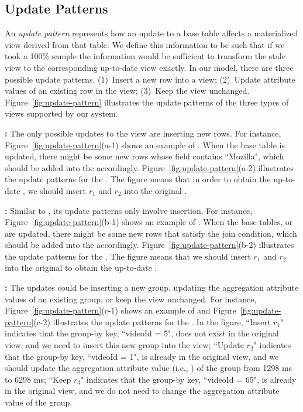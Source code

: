 \subsection{Update Patterns}\label{subsec:pattern}
An \emph{update pattern} represents how an update to a base table affects a materialized view derived from that table.
We define this information to be such that if we took a 100\% sample the information would be sufficient to transform the stale view to the corresponding up-to-date view exactly. 
In our model, there are three possible update patterns. (1)~Insert a new row into a view;
(2)~Update attribute values of an existing row in the view; (3)~Keep the view unchanged.
Figure~\ref{fig:update-pattern} illustrates the update patterns of the three types of views supported by our system.

\vspace{0.5em}

{\noindent \bf \spview :} The only possible updates to the view are inserting new rows.  
For instance, Figure~\ref{fig:update-pattern}(a-1) shows an example of \spview. When the base table  is updated, there might be some new rows whose  field contains ``Mozilla", which should be added into the \spview accordingly. Figure~\ref{fig:update-pattern}(a-2) illustrates the update patterns for the \spview. The figure means that in order to obtain the up-to-date \spview, we should insert $r_1$ and $r_2$ into the original \spview.

\vspace{0.5em}

{\noindent \bf \fjview :} Similar to \spview, its update patterns only involve insertion. For instance, Figure~\ref{fig:update-pattern}(b-1) shows an example of \fjview. When the base tables,  or  are updated, there might be some new rows that satisfy the join condition, which should be added into the \fjview accordingly. Figure~\ref{fig:update-pattern}(b-2) illustrates the update patterns for the \fjview. The figure means that we should insert $r_1$ and $r_2$ into the original \fjview to obtain the up-to-date \fjview.

\vspace{0.5em}

{\noindent \bf \aggview :} The updates could be inserting a new group, updating the aggregation attribute values of an existing group, or keep the view unchanged. 
For instance, Figure~\ref{fig:update-pattern}(c-1) shows an example of \aggview and Figure~\ref{fig:update-pattern}(c-2) illustrates the update patterns for the \aggview. In the figure, ``Insert $r_1$" indicates that the group-by key, ``videoId = 5", does not exist in the original view, and we need to insert this new group into the view; ``Update $r_2$" indicates that the group-by key, ``videoId = 1", is already in the original view, and we should update the aggregation attribute value (i.e., ) of the group from 1298 ms to 6298 ms; ``Keep $r_3$" indicates that the group-by key, ``videoId = 65", is already in the original  view, and we do not need to change the aggregation attribute value of the group.    



